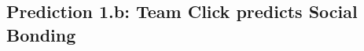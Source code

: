 \begin{CJK}{UTF8}{gbsn}



  \subsection{Prediction 1.b: Team Click predicts Social Bonding \label{app8:prediction1b}}





        


\end{CJK}
